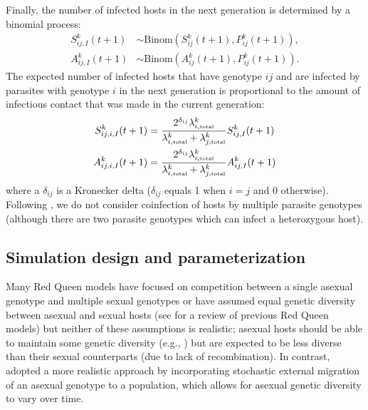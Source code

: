 \documentclass{article}\usepackage[]{graphicx}\usepackage[]{color}
\begin{document}
Finally, the number of infected hosts in the next generation is determined by a binomial process:
\begin{equation}
\begin{aligned}
S_{ij,I}^k (t+1) &\sim \mathrm{Binom}\left(S_{ij}^k (t+1), P_{ij}^k(t+1)\right),\\
A_{ij,I}^k (t+1) &\sim \mathrm{Binom}\left(A_{ij}^k (t+1), P_{ij}^k(t+1)\right).
\end{aligned}
\end{equation}
The expected number of infected hosts that have genotype $ij$ and are infected by parasites with genotype $i$ in the next generation is proportional to the amount of infectious contact that was made in the current generation:
\begin{equation}
\begin{aligned}
S_{ij,i,I}^k(t+1) &=  \frac{2^{\delta_{ij}} \lambda_{i, \textrm{\tiny total}}^k}{\lambda_{i, \textrm{\tiny total}}^k + \lambda_{j, \textrm{\tiny total}}^k} S_{ij,I}^k(t+1)\\
A_{ij,i,I}^k(t+1) &=  \frac{2^{\delta_{ij}} \lambda_{i, \textrm{\tiny total}}^k}{\lambda_{i, \textrm{\tiny total}}^k + \lambda_{j, \textrm{\tiny total}}^k} A_{ij,I}^k(t+1)
\end{aligned}
\end{equation}
where a $\delta_{ij}$ is a Kronecker delta ($\delta_{ij}$ equals 1 when $i = j$ and 0 otherwise).
Following \cite{ashby2015diversity}, we do not consider coinfection of hosts by multiple parasite genotypes (although there are two parasite genotypes which can infect a heterozygous host).

\subsection{Simulation design and parameterization}

Many Red Queen models have focused on competition between a single asexual genotype
and multiple sexual genotypes or have assumed equal genetic diversity between 
asexual and sexual hosts (see \cite{ashby2015diversity} for a review of previous 
Red Queen models) but neither of these assumptions is realistic;
asexual hosts should be able to maintain some genetic diversity (e.g., \citep{king2011parasites})
but are expected to be less diverse than their sexual counterparts (due to lack of recombination).
In contrast, \cite{ashby2015diversity} adopted a more realistic approach by 
incorporating stochastic external migration of an asexual genotype to a 
population, which allows for asexual genetic diversity to vary over time.
\end{document}
